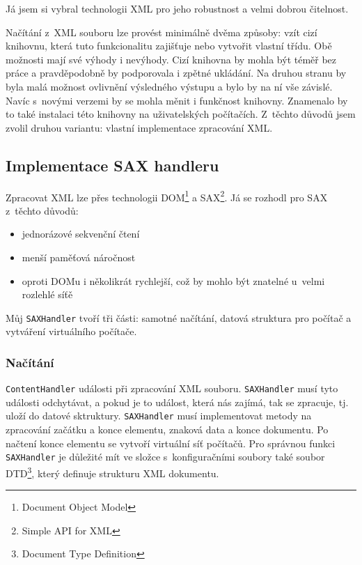 Já jsem si vybral technologii XML pro jeho robustnost a velmi dobrou čitelnost.

Načítání z~XML souboru lze provést minimálně dvěma způsoby: vzít cizí knihovnu, která tuto funkcionalitu zajišťuje nebo vytvořit vlastní třídu. Obě možnosti mají své výhody i nevýhody. Cizí knihovna by mohla být téměř bez práce a pravděpodobně by podporovala i zpětné ukládání. Na druhou stranu by byla malá možnost ovlivnění výsledného výstupu a bylo by na ní vše závislé. Navíc s~novými verzemi by se mohla měnit i funkčnost knihovny. Znamenalo by to také instalaci této knihovny na uživatelských počítačích. Z~těchto důvodů jsem zvolil druhou variantu: vlastní implementace zpracování XML. 


\subsection{Implementace SAX handleru}
Zpracovat XML lze přes technologii DOM\footnote{Document Object Model} a SAX\footnote{Simple API for XML}. Já se rozhodl pro SAX z~těchto důvodů:
\begin{itemize}
 \item jednorázové sekvenční čtení
 \item menší paměťová náročnost
 \item oproti DOMu i několikrát rychlejší, což by mohlo být znatelné u~velmi rozlehlé síťě
\end{itemize}

Můj \verb|SAXHandler| tvoří tři části: samotné načítání, datová struktura pro počítač a vytváření virtuálního počítače.

\subsubsection{Načítání}
\verb|ContentHandler|  události při zpracování XML souboru. \verb|SAXHandler| musí tyto události odchytávat, a pokud je to událost, která nás zajímá, tak se zpracuje, tj. uloží do datové sktruktury. \verb|SAXHandler| musí implementovat metody na zpracování začátku a konce elementu, znaková data a konce dokumentu. Po načtení konce elementu se vytvoří virtuální síť počítačů. Pro správnou funkci \verb|SAXHandler| je důležité mít ve složce s~konfiguračními soubory také soubor DTD\footnote{Document Type Definition}, který definuje strukturu XML dokumentu.

